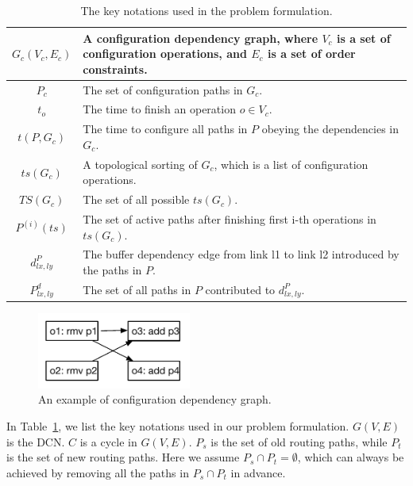 \begin{table}
\begin{tabularx}{0.48\textwidth}{ |c||X| }
	$G_c(V_c,E_c)$ & A configuration dependency graph, where $V_c$ is a set of configuration operations, and $E_c$ is a set of order constraints.\\
	\hline
	$P_c$ & The set of configuration paths in $G_c$.\\
	\hline
	$t_o$ & The time to finish an operation $ o \in V_c$.\\
	\hline
	$t(P, G_c)$& The time to configure all paths in $P$ obeying the dependencies in $G_c$.\\
	\hline
	$ts(G_c)$ & A topological sorting of $G_c$, which is a list of configuration operations. \\ 
	\hline
	$TS(G_c)$ & The set of all possible $ts(G_c)$. \\
	\hline
	$P^{(i)}(ts)$& The set of active paths after finishing first i-th operations in $ts(G_c)$.\\
	\hline
	$d_{lx,ly}^P$ & The buffer dependency edge from link l1 to link l2 introduced by the paths in $P$.\\
	\hline
	$P^d_{lx,ly}$ & The set of all paths in $P$ contributed to  $d_{lx,ly}^P$.\\
	\hline
\end{tabularx}
\caption{The key notations used in the problem formulation.}\label{table:formulation}
\end{table}


\begin{figure}[t]
	\centering
		\includegraphics[width=0.45\textwidth] {figs/formulation_example}
	\caption{An example of configuration dependency graph.}\label{fig:cdgraph}
\end{figure}

In Table~\ref{table:formulation}, we list the key notations used in our problem formulation. $G(V,E)$ is the DCN. $C$ is a cycle in $G(V,E)$.  $P_s$ is the set of old routing paths, while $P_t$ is the set of new routing paths. Here we assume $P_s \cap P_t = \emptyset$, which can always be achieved by removing all the paths in $P_s \cap P_t$ in advance.

